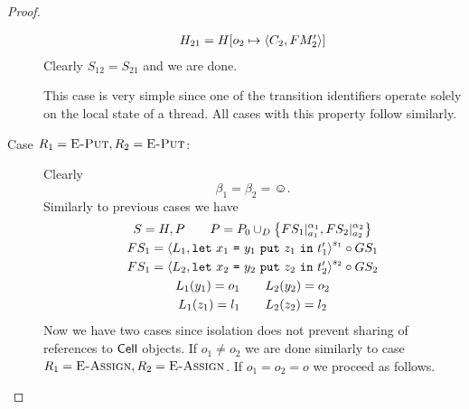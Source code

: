 \begin{proof}
\begin{description}
\begin{equation}
\begin{gathered}
          H_{21} = H[o_2 \mapsto \mbox{$\langle C_2, FM'_2 \rangle$}]
        \end{gathered}
      \end{equation}
      Clearly $S_{12} = S_{21}$ and we are done.
      \begin{remark}
        This case is very simple since one of the transition identifiers
        operate solely on the local state of a thread. All cases with this
        property follow similarly.
      \end{remark}
    \item[Case $R_1 = \mbox{{\sc E-Put}}, R_2 = \mbox{{\sc E-Put}}$:] Clearly
      \begin{equation*}
        \beta_1 = \beta_2 = \smiley.
      \end{equation*}
      Similarly to previous cases we have
      \begin{equation}
        \begin{gathered}
          S = H, P \quad\quad P = P_0 \cup_D \left\{ FS_1|_{a_1}^{\alpha_1},
          FS_2|_{a_2}^{\alpha_2} \right\} \\
          FS_1 = \mbox{$\langle L_1, \mbox{\mdseries\texttt{let}~$x_1$~\texttt{=}~$\mbox{\mdseries$y_1$~\texttt{put}~$z_1$}$~\texttt{in}~$t'_1$} \rangle$}^{s_1} \circ GS_1
          \\ 
          FS_1 = \mbox{$\langle L_2, \mbox{\mdseries\texttt{let}~$x_2$~\texttt{=}~$\mbox{\mdseries$y_2$~\texttt{put}~$z_2$}$~\texttt{in}~$t'_2$} \rangle$}^{s_2}
          \circ GS_2 \\
          L_1(y_1) = o_1 \quad\quad L_2(y_2) = o_2 \\
          L_1(z_1) = l_1 \quad\quad L_2(z_2) = l_2
        \end{gathered}
      \end{equation}
      Now we have two cases since isolation does not prevent sharing of
      references to $\mbox{$\mathsf{Cell}$}$ objects. If $o_1 \neq o_2$ we are done similarly
      to case $R_1 = \mbox{{\sc E-Assign}}, R_2 = \mbox{{\sc E-Assign}}$. If $o_1 = o_2 = o$ we proceed as
      follows.
      

\end{description}
\end{proof}
